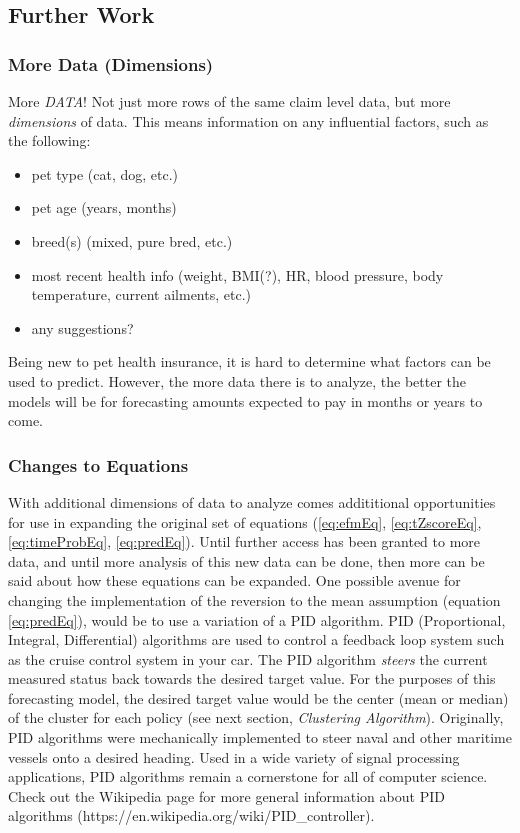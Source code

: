 \documentclass[12pt,letterpaper,titlepage]{article}
\begin{document}
\newpage						
		\subsection{Further Work} \label{sec:furtherWork}
		
		\subsubsection*{More Data (Dimensions)}
		More \emph{DATA}! Not just more rows of the same claim level data, but more \emph{dimensions} of data. This means information on any influential factors, such as the following:
			\begin{itemize}
				\item pet type (cat, dog, etc.)
				\item pet age (years, months)
				\item breed(s) (mixed, pure bred, etc.)
				\item most recent health info (weight, BMI(?), HR, blood pressure, body temperature, current ailments, etc.)
				\item any suggestions?
			\end{itemize}
			Being new to pet health insurance, it is hard to determine what factors can be used to predict. However, the more data there is to analyze, the better the models will be for forecasting amounts expected to pay in months or years to come.
		
		
		\subsubsection*{Changes to Equations} 
		With additional dimensions of data to analyze comes addititional opportunities for use in expanding the original set of equations (\ref{eq:efmEq}, \ref{eq:tZscoreEq}, \ref{eq:timeProbEq}, \ref{eq:predEq}). Until further access has been granted to more data, and until more analysis of this new data can be done, then more can be said about how these equations can be expanded. One possible avenue for changing the implementation of the reversion to the mean assumption (equation \ref{eq:predEq}), would be to use a variation of a PID algorithm. PID (Proportional, Integral, Differential) algorithms are used to control a feedback loop system such as the cruise control system in your car. The PID algorithm \emph{steers} the current measured status back towards the desired target value. For the purposes of this forecasting model, the desired target value would be the center (mean or median) of the cluster for each policy (see next section, \emph{Clustering Algorithm}). Originally, PID algorithms were mechanically implemented to steer naval and other maritime vessels onto a desired heading. Used in a wide variety of signal processing applications, PID algorithms remain a cornerstone for all of computer science. Check out the Wikipedia page for more general information about PID algorithms (https://en.wikipedia.org/wiki/PID\_controller).
		
\end{document}
